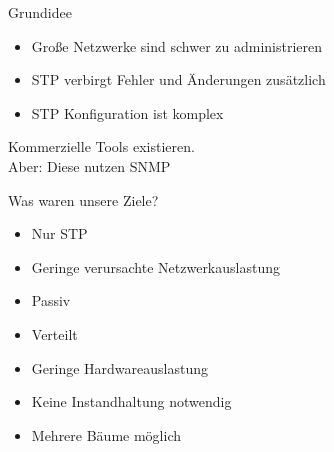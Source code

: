 \documentclass{beamer}
\begin{document}
\begin{frame}{Grundidee}
    \begin{itemize}[<+->]
        \item Große Netzwerke sind schwer zu administrieren
        \item STP verbirgt Fehler und Änderungen zusätzlich
        \item STP Konfiguration ist komplex
    \end{itemize}
    \pause
    Kommerzielle Tools existieren.\\
    \alert{Aber: Diese nutzen SNMP}
\end{frame}


\begin{frame}{Was waren unsere Ziele?}
    \begin{itemize}[<+->]
        \item Nur STP
        \item Geringe verursachte Netzwerkauslastung
        \item Passiv
        \item Verteilt
        \item Geringe Hardwareauslastung
        \item Keine Instandhaltung notwendig
        \item Mehrere Bäume möglich
    \end{itemize}
\end{frame}
\end{document}
